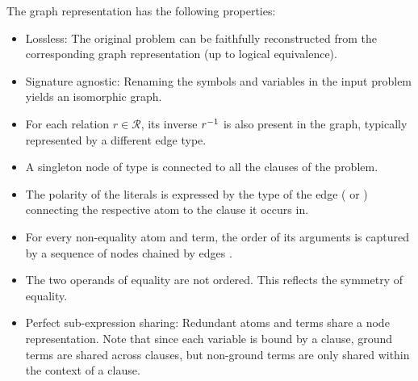The graph representation has the following properties:
\begin{itemize}
\item Lossless: The original problem can be faithfully reconstructed from the corresponding graph representation
(up to logical equivalence).
\item Signature agnostic: Renaming the symbols and variables in the input problem yields an isomorphic graph.
\item For each relation $r \in \mathcal{R}$, its inverse $r^{-1}$ is also present in the graph,
typically represented by a different edge type.
\item A singleton node of type  is connected to all the clauses of the problem.
\item The polarity of the literals is expressed by the type of the edge (\epos{} or \eneg{})
connecting the respective atom to the clause it occurs in.
\item For every non-equality atom and term, the order of its arguments is captured by a sequence of  nodes chained by edges \cite{Rawson2020}.
\item The two operands of equality are not ordered.
This reflects the symmetry of equality.
\item Perfect sub-expression sharing:
Redundant atoms and terms share a node representation.
Note that since each variable is bound by a clause,
ground terms are shared across clauses,
but non-ground terms are only shared within the context of a clause.
\end{itemize}

